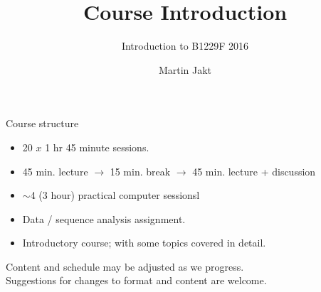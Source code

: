 \documentclass[pdf]{beamer}
\title{Course Introduction}
\subtitle{Introduction to B1229F 2016}
\author{Martin Jakt}
\begin{document}
\begin{frame}
  \titlepage
\end{frame}

\begin{frame}{Course structure}
  \begin{itemize}
    \item 20 $x$ 1 hr 45 minute sessions.
    \pause
    \item 45 min. lecture $\rightarrow$ 15 min. break $\rightarrow$ 45
      min. lecture + discussion
    \pause
    \item $\sim$4 (3 hour) practical computer sessionsl
    \pause
    \item Data / sequence analysis assignment.
    \pause
    \item Introductory course; with some topics covered in detail.
  \end{itemize}
  \pause
  \vspace{0.2cm}
  Content and schedule may be adjusted as we progress.\\
  Suggestions for changes to format and content are welcome.
\end{frame}
\end{document}
